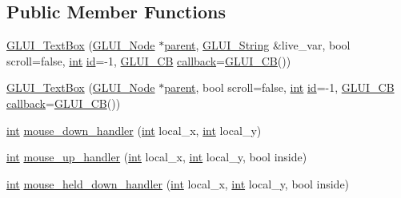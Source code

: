 \subsection*{Public Member Functions}
\begin{DoxyCompactItemize}
\item 
\hyperlink{class_g_l_u_i___text_box_a2973d6ed429cb52fc794273939fbbcdb}{G\+L\+U\+I\+\_\+\+Text\+Box} (\hyperlink{class_g_l_u_i___node}{G\+L\+U\+I\+\_\+\+Node} $\ast$\hyperlink{class_g_l_u_i___node_a8ed65d447784f6f88bd3e2e2bcac6cdb}{parent}, \hyperlink{glui_8h_aada824856f7bcf29794719981ebd8f60}{G\+L\+U\+I\+\_\+\+String} \&live\+\_\+var, bool scroll=false, \hyperlink{wglext_8h_a500a82aecba06f4550f6849b8099ca21}{int} \hyperlink{glext_8h_a58c2a664503e14ffb8f21012aabff3e9}{id}=-\/1, \hyperlink{class_g_l_u_i___c_b}{G\+L\+U\+I\+\_\+\+C\+B} \hyperlink{class_g_l_u_i___control_a96060fe0cc6d537e736dd6eef78e24ab}{callback}=\hyperlink{class_g_l_u_i___c_b}{G\+L\+U\+I\+\_\+\+C\+B}())
\item 
\hyperlink{class_g_l_u_i___text_box_a91e7c9fcb2f00ac68e9d10dcb9a09769}{G\+L\+U\+I\+\_\+\+Text\+Box} (\hyperlink{class_g_l_u_i___node}{G\+L\+U\+I\+\_\+\+Node} $\ast$\hyperlink{class_g_l_u_i___node_a8ed65d447784f6f88bd3e2e2bcac6cdb}{parent}, bool scroll=false, \hyperlink{wglext_8h_a500a82aecba06f4550f6849b8099ca21}{int} \hyperlink{glext_8h_a58c2a664503e14ffb8f21012aabff3e9}{id}=-\/1, \hyperlink{class_g_l_u_i___c_b}{G\+L\+U\+I\+\_\+\+C\+B} \hyperlink{class_g_l_u_i___control_a96060fe0cc6d537e736dd6eef78e24ab}{callback}=\hyperlink{class_g_l_u_i___c_b}{G\+L\+U\+I\+\_\+\+C\+B}())
\item 
\hyperlink{wglext_8h_a500a82aecba06f4550f6849b8099ca21}{int} \hyperlink{class_g_l_u_i___text_box_a193bf66dde6e93a501af7a04dd57fec3}{mouse\+\_\+down\+\_\+handler} (\hyperlink{wglext_8h_a500a82aecba06f4550f6849b8099ca21}{int} local\+\_\+x, \hyperlink{wglext_8h_a500a82aecba06f4550f6849b8099ca21}{int} local\+\_\+y)
\item 
\hyperlink{wglext_8h_a500a82aecba06f4550f6849b8099ca21}{int} \hyperlink{class_g_l_u_i___text_box_ae2ec21715ffdacd73497acc91444a637}{mouse\+\_\+up\+\_\+handler} (\hyperlink{wglext_8h_a500a82aecba06f4550f6849b8099ca21}{int} local\+\_\+x, \hyperlink{wglext_8h_a500a82aecba06f4550f6849b8099ca21}{int} local\+\_\+y, bool inside)
\item 
\hyperlink{wglext_8h_a500a82aecba06f4550f6849b8099ca21}{int} \hyperlink{class_g_l_u_i___text_box_a825107a1c8c86b3a6327f62e634e8a4e}{mouse\+\_\+held\+\_\+down\+\_\+handler} (\hyperlink{wglext_8h_a500a82aecba06f4550f6849b8099ca21}{int} local\+\_\+x, \hyperlink{wglext_8h_a500a82aecba06f4550f6849b8099ca21}{int} local\+\_\+y, bool inside)

\end{DoxyCompactItemize}
